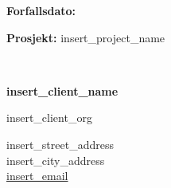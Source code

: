 \begin{minipage}[t]{0.38\textwidth}
	\textbf{Forfallsdato:} 

	\textbf{Prosjekt:} insert_project_name
\end{minipage}
\begin{minipage}[t]{0.1\textwidth}
	~ %
\end{minipage}
\begin{minipage}[t]{0.56\textwidth}
	\textbf{insert_client_name}

	insert_client_org

	insert_street_address  \\
	insert_city_address \\
	\href{mailto:insert_email}{insert_email}
\end{minipage}
